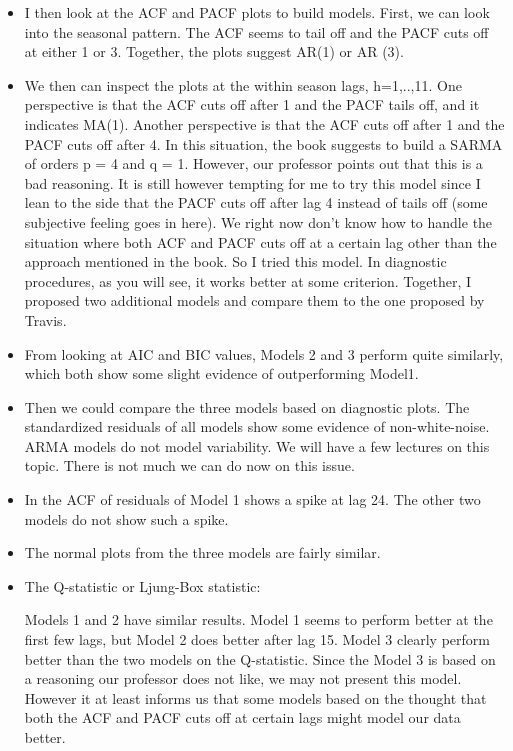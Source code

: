 \begin{itemize}
	\item     I then look at the ACF and PACF plots to build models. First, we can look into the seasonal pattern. The ACF seems to tail off and the PACF cuts off at either 1 or 3. Together, the plots suggest AR(1) or AR (3).

\item We then can inspect the plots at the within season lags, h=1,..,11. One perspective is that the ACF cuts off after 1 and the PACF tails off, and it indicates MA(1). Another perspective is that the ACF cuts off after 1 and the PACF cuts off after 4. In this situation, the book suggests to build a SARMA of orders p = 4 and q = 1. However, our professor points out that this is a bad reasoning. It is still however tempting for me to try this model since I lean to the side that the PACF cuts off after lag 4 instead of tails off (some subjective feeling goes in here). We right now don't know how to handle the situation where both ACF and PACF cuts off at a certain lag other than the approach mentioned in the book. So I tried this model. In diagnostic procedures, as you will see, it works better at some criterion. Together, I proposed two additional models and compare them to the one proposed by Travis.

 \item  From looking at AIC and BIC values, Models 2 and 3 perform quite similarly, which both show some slight evidence of outperforming Model1.
  
  \item Then we could compare the three models based on diagnostic plots. The standardized residuals of all models show some evidence of non-white-noise. ARMA models do not model variability. We will have a few lectures on this topic. There is not much we can do now on this issue.
  
 \item  In the ACF of residuals of Model 1 shows a spike at lag 24. The other two models do not show such a spike.
  
  \item The normal plots from the three models are fairly similar.
  
  \item The Q-statistic or Ljung-Box statistic:
  
  Models 1 and 2 have similar results. Model 1 seems to perform better at the first few lags, but Model 2 does better after lag 15. Model 3 clearly perform better than the two models on the Q-statistic. Since the Model 3 is based on a reasoning our professor does not like, we may not present this model. However it at least informs us that some models based on the thought that both the ACF and PACF cuts off at certain lags might model our data better. 
  

\end{itemize}
